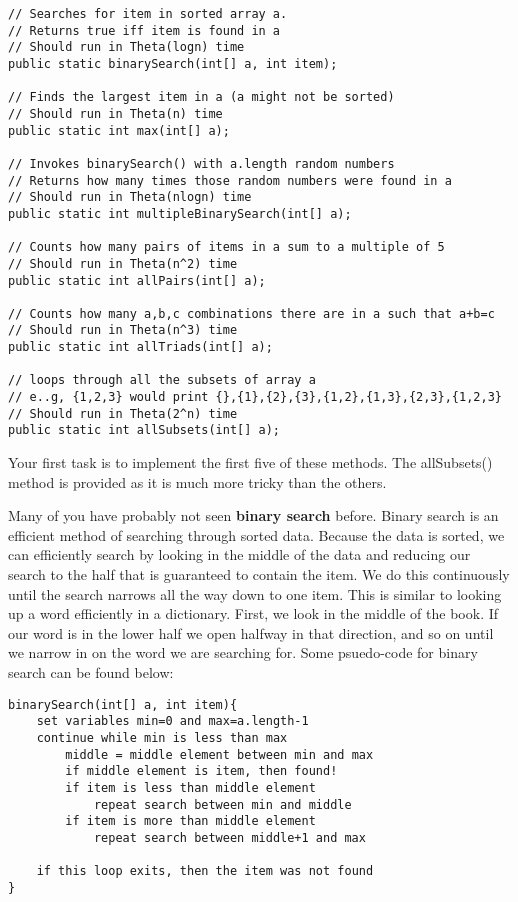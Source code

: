 \documentclass[paper=a4, fontsize=11pt, parskip=full]{scrartcl} %
\numberwithin{equation}{section} %
\numberwithin{figure}{section} %
\numberwithin{table}{section} %
\begin{document}
\begin{lstlisting}
// Searches for item in sorted array a.
// Returns true iff item is found in a
// Should run in Theta(logn) time
public static binarySearch(int[] a, int item);

// Finds the largest item in a (a might not be sorted)
// Should run in Theta(n) time
public static int max(int[] a);

// Invokes binarySearch() with a.length random numbers
// Returns how many times those random numbers were found in a
// Should run in Theta(nlogn) time
public static int multipleBinarySearch(int[] a);

// Counts how many pairs of items in a sum to a multiple of 5
// Should run in Theta(n^2) time
public static int allPairs(int[] a);

// Counts how many a,b,c combinations there are in a such that a+b=c
// Should run in Theta(n^3) time
public static int allTriads(int[] a);

// loops through all the subsets of array a
// e..g, {1,2,3} would print {},{1},{2},{3},{1,2},{1,3},{2,3},{1,2,3}
// Should run in Theta(2^n) time
public static int allSubsets(int[] a);
\end{lstlisting}

Your first task is to implement the first five of these methods. The allSubsets() method is provided as it is much more tricky than the others.

Many of you have probably not seen \textbf{binary search} before. Binary search is an efficient method of searching through sorted data. Because the data is sorted, we can efficiently search by looking in the middle of the data and reducing our search to the half that is guaranteed to contain the item. We do this continuously until the search narrows all the way down to one item. This is similar to looking up a word efficiently in a dictionary. First, we look in the middle of the book. If our word is in the lower half we open halfway in that direction, and so on until we narrow in on the word we are searching for. Some psuedo-code for binary search can be found below:

\begin{lstlisting}
binarySearch(int[] a, int item){
	set variables min=0 and max=a.length-1
	continue while min is less than max
		middle = middle element between min and max
		if middle element is item, then found!
		if item is less than middle element
			repeat search between min and middle
		if item is more than middle element
			repeat search between middle+1 and max

	if this loop exits, then the item was not found
}
\end{lstlisting}
\end{document}
